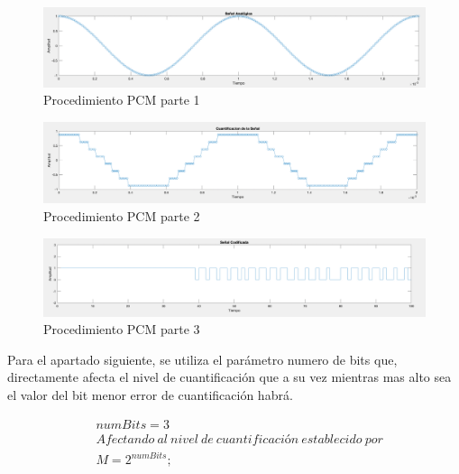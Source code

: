 \begin{figure}[H]
    \centering
    \includegraphics[scale=0.2]{Imagenes/senalanalogica.png}
    \caption{Procedimiento PCM parte 1}
    \label{fig:Procedimiento_PCM_parte_1}
\end{figure}


\begin{figure}[H]
    \centering
    \includegraphics[scale=0.2]{Imagenes/cuantizacion.png}
    \caption{Procedimiento PCM parte 2}
    \label{fig:Procedimiento_PCM_parte_2}
\end{figure}

\begin{figure}[H]
    \centering
    \includegraphics[scale=0.2]{Imagenes/codificacion.png}
    \caption{Procedimiento PCM parte 3}
    \label{fig:Procedimiento_PCM_parte_3}
\end{figure}



Para el apartado siguiente, se utiliza el  parámetro numero de bits  que, directamente afecta el nivel de cuantificación que a su vez mientras mas alto sea el valor del bit menor error de cuantificación habrá.

\begin{equation} \label{eq:frecuencia_de_señal_cajo_y_ciclo_de_trabajo1}
\begin{split} 
&numBits=3 \\
&Afectando\ al\ nivel\ de\ cuantificación\ establecido\ por \\ 
&M = 2^{numBits}; \\
\end{split} 
\end{equation}


